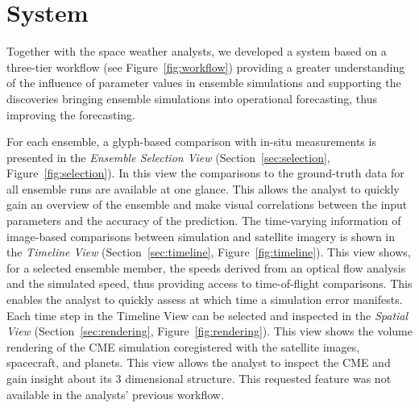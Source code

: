 \documentclass[journal]{vgtc}                %
\begin{document}

\section{System}
Together with the space weather analysts, we developed a system based on a three-tier workflow (see Figure~\ref{fig:workflow}) providing a greater understanding of the influence of parameter values in ensemble simulations and supporting the discoveries bringing ensemble simulations into operational forecasting, thus improving the forecasting.

For each ensemble, a glyph-based comparison with in-situ measurements is presented in the \emph{Ensemble Selection View} (Section~\ref{sec:selection}, Figure~\ref{fig:selection}). In this view the comparisons to the ground-truth data for all ensemble runs are available at one glance. This allows the analyst to quickly gain an overview of the ensemble and make visual correlations between the input parameters and the accuracy of the prediction. The time-varying information of image-based comparisons between simulation and satellite imagery is shown in the \emph{Timeline View} (Section~\ref{sec:timeline}, Figure~\ref{fig:timeline}). This view shows, for a selected ensemble member, the speeds derived from an optical flow analysis and the simulated speed, thus providing access to time-of-flight comparisons. This enables the analyst to quickly assess at which time a simulation error manifests. Each time step in the Timeline View can be selected and inspected in the \emph{Spatial View} (Section~\ref{sec:rendering}, Figure~\ref{fig:rendering}). This view shows the volume rendering of the CME simulation coregistered with the satellite images, spacecraft, and planets. This view allows the analyst to inspect the CME and gain insight about its 3 dimensional structure. This requested feature was not available in the analysts' previous workflow.
\end{document}
